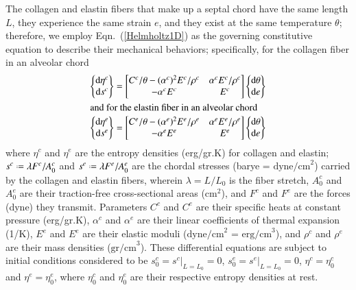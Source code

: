 The collagen and elastin fibers that make up a septal chord have the same length $L$, they experience the same strain $e$, and they exist at the same temperature $\theta$; therefore, we employ Eqn.~(\ref{Helmholtz1D}) as the governing constitutive equation to describe their mechanical behaviors; specifically, for the collagen fiber in an alveolar chord
\begin{subequations}
    \label{alveolarChord}
    \begin{align}
    \left\{ \begin{matrix} 
    \mathrm{d} \eta^c \\ \mathrm{d} s^c
    \end{matrix} \right\} = \begin{bmatrix}
    C^c / \theta - ( \alpha^c )^2 E^c / \rho^c & \alpha^c E^c / \rho^c \\
    -\alpha^c E^c & E^c
    \end{bmatrix} \left\{ \begin{matrix}
    \mathrm{d} \theta \\ \mathrm{d} e
    \end{matrix} \right\} \\
    \intertext{and for the elastin fiber in an alveolar chord}
    \left\{ \begin{matrix} 
    \mathrm{d} \eta^e \\ \mathrm{d} s^e
    \end{matrix} \right\} = \begin{bmatrix}
    C^e / \theta - ( \alpha^e )^2 E^e / \rho^e & \alpha^e E^e / \rho^e \\
    -\alpha^e E^e & E^e
    \end{bmatrix} \left\{ \begin{matrix}
    \mathrm{d} \theta \\ \mathrm{d} e
    \end{matrix} \right\} 
    \end{align}
\end{subequations}
where $\eta^c$ and $\eta^e$ are the entropy densities (erg/gr.K) for collagen and elastin; $s^c \defeq \lambda F^c / A^c_0$ and $s^e \defeq \lambda F^e / A_0^e$ are the chordal stresses (barye = $\text{dyne/cm}^2$) carried by the collagen and elastin fibers, wherein $\lambda = L/L_0$ is the fiber stretch, $A^c_0$ and $A^e_0$ are their traction-free cross-sectional areas ($\text{cm}^2$), and $F^c$ and $F^e$ are the forces (dyne) they transmit.  Parameters $C^c$ and $C^e$ are their specific heats at constant pressure (erg/gr.K), $\alpha^c$ and $\alpha^e$ are their linear coefficients of thermal expansion (1/K), $E^e$ and $E^e$ are their elastic moduli ($\text{dyne/cm}^2$ = $\text{erg/cm}^3$), and $\rho^c$ and $\rho^e$ are their mass densities ($\text{gr/cm}^3$).  These differential equations are subject to initial conditions considered to be $s^c_0 = s^c |_{L = L_0} = 0$, $s^e_0 = s^e |_{L = L_0} = 0$, $\eta^c = \eta^c_0$ and $\eta^e = \eta^e_0$, where  $\eta_0^c$ and $\eta_0^e$ are their respective entropy densities at rest.

